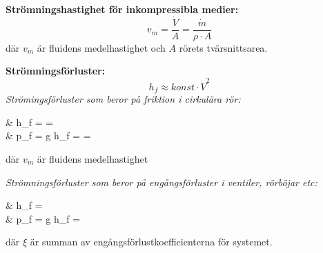 	\textbf{Strömningshastighet för inkompressibla medier: } 
	\begin{equation*}
    v_m = \dfrac{\dot{V}}{A} =  \dfrac{\dot{m}}{\rho \cdot A}
	\end{equation*}
		där $v_m$ är fluidens medelhastighet och $A$ rörets tvärsnittsarea.\par 
	\textbf{Strömningsförluster: } 
	\begin{equation*}
		h_f \approx konst \cdot \dot{V}^2
	\end{equation*}
	\textit{Strömingsförluster som beror på friktion i cirkulära rör:}
	\begin{flalign*}
	&	h_f =  =   \\
	&	p_f = \rho \cdot g \cdot h_f = \rho \cdot {} =  \rho \cdot {}
	\end{flalign*}
		där $v_m$ är fluidens medelhastighet \par 
	\textit{Strömningsförluster som beror på engångsförluster i ventiler, rörböjar etc:} 
	\begin{flalign*}
	&	h_f = \dfrac{\xi \cdot v^2_m}{2 \cdot g}\\	
	&	p_f = \rho \cdot g \cdot h_f = \rho \cdot \dfrac{\xi \cdot v^2_m}{2}	
	\end{flalign*}
 där $\xi$ är summan av engångsförlustkoefficienterna för systemet. 
